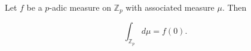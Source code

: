 Let $f$ be a $p$-adic measure on $\mathbb{Z}_p$ with associated measure $\mu$. Then

$$\int_{\mathbb{Z}_p} d\mu = f(0).$$
